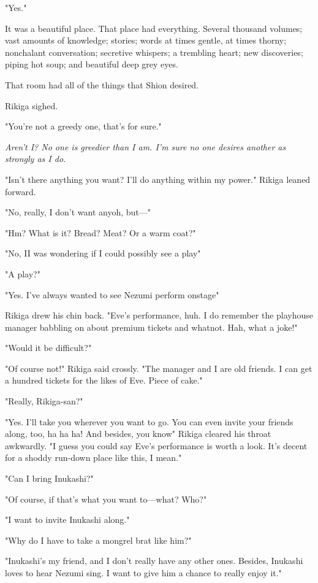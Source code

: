 "Yes."

It was a beautiful place. That place had everything. Several thousand volumes; vast amounts of knowledge; stories; words at times gentle, at times thorny; nonchalant conversation; secretive whispers; a trembling heart; new discoveries; piping hot soup; and beautiful deep grey eyes.

That room had all of the things that Shion desired.

Rikiga sighed.

"You're not a greedy one, that's for sure."

\emph{Aren't I? No one is greedier than I am. I'm sure no one desires another as strongly as I do.}

"Isn't there anything you want? I'll do anything within my power." Rikiga leaned forward.

"No, really, I don't want any\el oh, but---"

"Hm? What is it? Bread? Meat? Or a warm coat?"

"No, I\el I was wondering if I could possibly see a play\el "

"A play?"

"Yes. I've always wanted to see Nezumi perform onstage\el "

Rikiga drew his chin back. "Eve's performance, huh. I do remember the playhouse manager babbling on about premium tickets and whatnot. Hah, what a joke!"

"Would it be difficult?"

"Of course not!" Rikiga said crossly. "The manager and I are old friends. I can get a hundred tickets for the likes of Eve. Piece of cake."

"Really, Rikiga-san?"

"Yes. I'll take you wherever you want to go. You can even invite your friends along, too, ha ha ha! And besides, you know\el " Rikiga cleared his throat awkwardly. "I guess you could say Eve's performance is worth a look. It's decent for a shoddy run-down place like this, I mean."

"Can I bring Inukashi?"

"Of course, if that's what you want to---what? Who?"

"I want to invite Inukashi along."

"Why do I have to take a mongrel brat like him?"

"Inukashi's my friend, and I don't really have any other ones. Besides, Inukashi loves to hear Nezumi sing. I want to give him a chance to really enjoy it."

